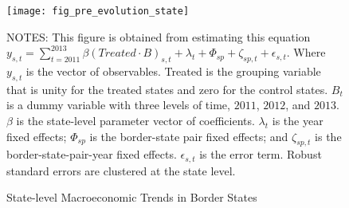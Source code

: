 \begin{figure}[H]
    \centering
    \texttt{[image: fig\_pre\_evolution\_state]}
    \caption{State-level Macroeconomic Trends in Border States}
    \label{fig:state-level-macroeconomic-trends-in-border-states}
    \begin{minipage}{18cm}
        \vspace{0.05in}
        {NOTES: This figure is obtained from estimating this equation $y_{s,t} = \sum_{t = 2011}^{2013} \beta (Treated \cdot B)_{s,t} + \lambda_{t} + \Phi_{sp} + \zeta_{sp,t} + \epsilon_{s,t}$. Where $y_{s,t}$ is the vector of observables. Treated is the grouping variable that is unity for the treated states and zero for the control states. $B_{t}$ is a dummy variable with three levels of time, $2011$, $2012$, and $2013$. $\beta$ is the state-level parameter vector of coefficients. $\lambda_{t}$ is the year fixed effects; $\Phi_{sp}$ is the border-state pair fixed effects; and $\zeta_{sp,t}$ is the border-state-pair-year fixed effects. $\epsilon_{s,t}$ is the error term. Robust standard errors are clustered at the state level. \par}
    \end{minipage}
\end{figure}